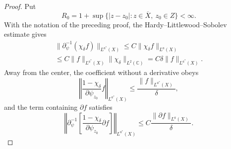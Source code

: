 \documentclass[a4paper,11pt]{article}
\newcommand{\pr}{\partial}
\newcommand{\psiz}{\psi_{z_0}}
\newcommand{\C}{\mathbb{C}}
\theoremstyle{plain}
\theoremstyle{definition}
\theoremstyle{remark}
\begin{document}
\begin{proof}
Put
\begin{equation}
        R_0=1+\sup\{|z-z_0|:z\in\overline{X},\ z_0\in Z\}<\infty.
\end{equation}
With the notation of the preceding proof, the Hardy--Littlewood--Sobolev estimate gives
\begin{multline}
\|\partial_\psi^{-1}(\chi_\delta f)\|_{L^{a^*}(X)}\leq C\|\chi_\delta f\|_{L^a(X)}\\[5pt]
\leq C\|f\|_{L^{a^*}(X)}\|\chi_\delta\|_{L^2(\C)}= C\delta \|f\|_{L^{a^*}(X)}.
\end{multline}
Away from the center, the coefficient without a derivative obeys
\begin{equation}
\left\Vert \frac{1-\chi_\delta}{\pr\psiz} f\right\Vert_{L^{a^*}(X)}\leq\frac{\|f\|_{L^{a^*}(X)}}{\delta},
\end{equation}
and the term containing $\partial f$ satisfies
\begin{equation}
\left\Vert\pr_\psi^{-1}\left[\frac{1-\chi_\delta}{\pr\psiz} \pr f  \right]\right\Vert_{L^{a^*}(X)}\leq C\frac{\|\pr f\|_{L^a(X)}}{\delta}.
\end{equation}


\end{proof}
\end{document}
